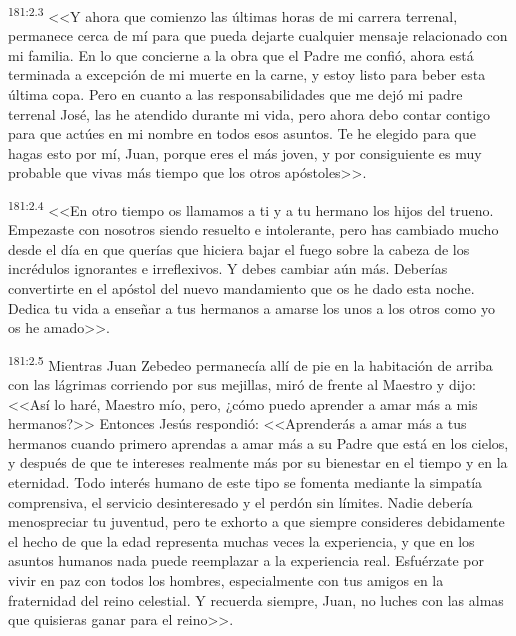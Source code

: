 \par 
\textsuperscript{181:2.3} <<Y ahora que comienzo las últimas horas de mi carrera terrenal, permanece cerca de mí para que pueda dejarte cualquier mensaje relacionado con mi familia. En lo que concierne a la obra que el Padre me confió, ahora está terminada a excepción de mi muerte en la carne, y estoy listo para beber esta última copa. Pero en cuanto a las responsabilidades que me dejó mi padre terrenal José, las he atendido durante mi vida, pero ahora debo contar contigo para que actúes en mi nombre en todos esos asuntos. Te he elegido para que hagas esto por mí, Juan, porque eres el más joven, y por consiguiente es muy probable que vivas más tiempo que los otros apóstoles>>.

\par 
\textsuperscript{181:2.4} <<En otro tiempo os llamamos a ti y a tu hermano los hijos del trueno. Empezaste con nosotros siendo resuelto e intolerante, pero has cambiado mucho desde el día en que querías que hiciera bajar el fuego sobre la cabeza de los incrédulos ignorantes e irreflexivos. Y debes cambiar aún más. Deberías convertirte en el apóstol del nuevo mandamiento que os he dado esta noche. Dedica tu vida a enseñar a tus hermanos a amarse los unos a los otros como yo os he amado>>.

\par 
\textsuperscript{181:2.5} Mientras Juan Zebedeo permanecía allí de pie en la habitación de arriba con las lágrimas corriendo por sus mejillas, miró de frente al Maestro y dijo: <<Así lo haré, Maestro mío, pero, ¿cómo puedo aprender a amar más a mis hermanos?>> Entonces Jesús respondió: <<Aprenderás a amar más a tus hermanos cuando primero aprendas a amar más a su Padre que está en los cielos, y después de que te intereses realmente más por su bienestar en el tiempo y en la eternidad. Todo interés humano de este tipo se fomenta mediante la simpatía comprensiva, el servicio desinteresado y el perdón sin límites. Nadie debería menospreciar tu juventud, pero te exhorto a que siempre consideres debidamente el hecho de que la edad representa muchas veces la experiencia, y que en los asuntos humanos nada puede reemplazar a la experiencia real. Esfuérzate por vivir en paz con todos los hombres, especialmente con tus amigos en la fraternidad del reino celestial. Y recuerda siempre, Juan, no luches con las almas que quisieras ganar para el reino>>.

